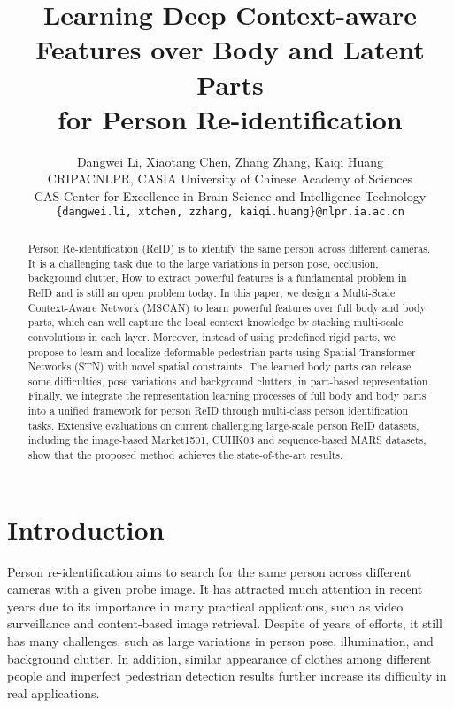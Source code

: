 \documentclass[10pt,twocolumn,letterpaper]{article}
\begin{document}
\title{Learning Deep Context-aware Features over Body and Latent Parts \\ for Person Re-identification}

\author{
Dangwei Li, Xiaotang Chen, Zhang Zhang, Kaiqi Huang\\
CRIPACNLPR, CASIA  \quad University of Chinese Academy of Sciences\\
CAS Center for Excellence in Brain Science and Intelligence Technology\\
{\tt\small {\{dangwei.li, xtchen, zzhang, kaiqi.huang\}}@nlpr.ia.ac.cn}
}



\maketitle
\thispagestyle{empty}

\begin{abstract}
  Person Re-identification (ReID) is to identify the same person across different cameras.
  It is a challenging task due to the large variations in person pose, occlusion, background clutter, \etc
  How to extract powerful features is a fundamental problem in ReID and is still an open problem today.
  In this paper, we design a Multi-Scale Context-Aware Network (MSCAN) to learn powerful features
  over full body and body parts, which can well capture the local context knowledge by stacking multi-scale convolutions in each layer.
  Moreover, instead of using predefined rigid parts, we propose to learn and localize
  deformable pedestrian parts using Spatial Transformer Networks (STN) with novel spatial constraints.
  The learned body parts can release some difficulties, \eg pose variations and background clutters, in part-based representation.
  Finally, we integrate the representation learning processes of full body and body parts into a unified framework for person ReID
  through multi-class person identification tasks.
  Extensive evaluations on current challenging large-scale person ReID datasets, including the image-based Market1501, CUHK03 and sequence-based MARS datasets,
  show that the proposed method achieves the state-of-the-art results.
\end{abstract}

\vspace{-1.0em}
\section{Introduction}
Person re-identification aims to search for the same person across different cameras with a given probe image.
It has attracted much attention in recent years due to its importance in many practical applications, such as video surveillance and content-based image retrieval.
Despite of years of efforts, it still has many challenges, such as large variations in person pose, illumination, and background clutter.
In addition, similar appearance of clothes among different people and imperfect pedestrian detection results further increase its difficulty in
real applications.
\end{document}
